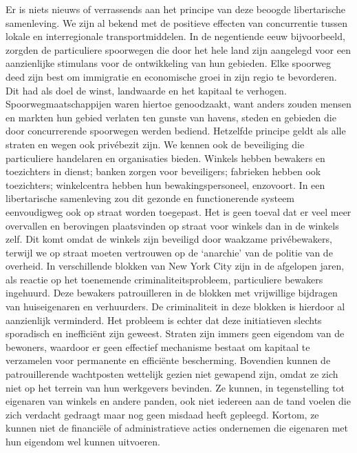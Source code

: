 \documentclass[
  a5paper,
  smalldemyvopaper,10pt,twoside,onecolumn,openright,extrafontsizes,hidelinks]{memoir}
\begin{document}
Er is niets nieuws of verrassends aan het principe van deze beoogde
libertarische samenleving. We zijn al bekend met de positieve effecten
van concurrentie tussen lokale en interregionale transportmiddelen. In
de negentiende eeuw bijvoorbeeld, zorgden de particuliere spoorwegen die
door het hele land zijn aangelegd voor een aanzienlijke stimulans voor
de ontwikkeling van hun gebieden. Elke spoorweg deed zijn best om
immigratie en economische groei in zijn regio te bevorderen. Dit had als
doel de winst, landwaarde en het kapitaal te verhogen.
Spoorwegmaatschappijen waren hiertoe genoodzaakt, want anders zouden
mensen en markten hun gebied verlaten ten gunste van havens, steden en
gebieden die door concurrerende spoorwegen werden bediend. Hetzelfde
principe geldt als alle straten en wegen ook privébezit zijn. We kennen
ook de beveiliging die particuliere handelaren en organisaties bieden.
Winkels hebben bewakers en toezichters in dienst; banken zorgen voor
beveiligers; fabrieken hebben ook toezichters; winkelcentra hebben hun
bewakingspersoneel, enzovoort. In een libertarische samenleving zou dit
gezonde en functionerende systeem eenvoudigweg ook op straat worden
toegepast. Het is geen toeval dat er veel meer overvallen en berovingen
plaatsvinden op straat voor winkels dan in de winkels zelf. Dit komt
omdat de winkels zijn beveiligd door waakzame privébewakers, terwijl we
op straat moeten vertrouwen op de `anarchie' van de politie van de
overheid. In verschillende blokken van New York City zijn in de
afgelopen jaren, als reactie op het toenemende criminaliteitsprobleem,
particuliere bewakers ingehuurd. Deze bewakers patrouilleren in de
blokken met vrijwillige bijdragen van huiseigenaren en verhuurders. De
criminaliteit in deze blokken is hierdoor al aanzienlijk verminderd. Het
probleem is echter dat deze initiatieven slechts sporadisch en
inefficiënt zijn geweest. Straten zijn immers geen eigendom van de
bewoners, waardoor er geen effectief mechanisme bestaat om kapitaal te
verzamelen voor permanente en efficiënte bescherming. Bovendien kunnen
de patrouillerende wachtposten wettelijk gezien niet gewapend zijn,
omdat ze zich niet op het terrein van hun werkgevers bevinden. Ze
kunnen, in tegenstelling tot eigenaren van winkels en andere panden, ook
niet iedereen aan de tand voelen die zich verdacht gedraagt maar nog
geen misdaad heeft gepleegd. Kortom, ze kunnen niet de financiële of
administratieve acties ondernemen die eigenaren met hun eigendom wel
kunnen uitvoeren.
\end{document}
